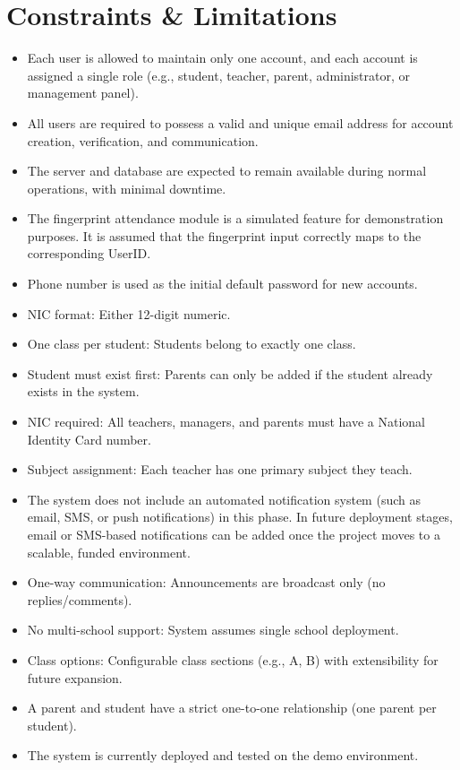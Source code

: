 \documentclass[12pt, a4paper]{report}
\begin{document}
\section{Constraints \& Limitations}

\begin{itemize}
    \item Each user is allowed to maintain only one account, and each account is assigned a single role (e.g., student, teacher, parent, administrator, or management panel).
    \item All users are required to possess a valid and unique email address for account creation, verification, and communication.
    \item The server and database are expected to remain available during normal operations, with minimal downtime.
    \item The fingerprint attendance module is a simulated feature for demonstration purposes. It is assumed that the fingerprint input correctly maps to the corresponding UserID.
    \item Phone number is used as the initial default password for new accounts.
    \item NIC format: Either 12-digit numeric.
    \item One class per student: Students belong to exactly one class.
    \item Student must exist first: Parents can only be added if the student already exists in the system.
    \item NIC required: All teachers, managers, and parents must have a National Identity Card number.
    \item Subject assignment: Each teacher has one primary subject they teach.
    \item The system does not include an automated notification system (such as email, SMS, or push notifications) in this phase. In future deployment stages, email or SMS-based notifications can be added once the project moves to a scalable, funded environment.
    \item One-way communication: Announcements are broadcast only (no replies/comments).
    \item No multi-school support: System assumes single school deployment.
    \item Class options: Configurable class sections (e.g., A, B) with extensibility for future expansion.
    \item A parent and student have a strict one-to-one relationship (one parent per student).
    \item The system is currently deployed and tested on the demo environment.
\end{itemize}
\end{document}
